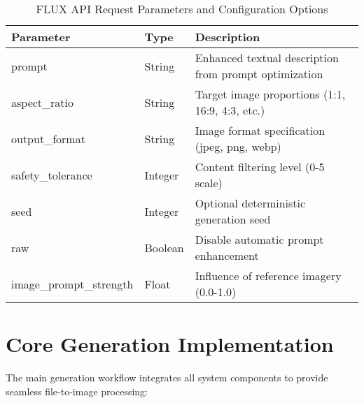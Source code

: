 \begin{table}[H]
\centering
\caption{FLUX API Request Parameters and Configuration Options}
\label{tab:flux_api_parameters}
{\begin{tabular}{lll}
\toprule
\textbf{Parameter} & \textbf{Type} & \textbf{Description} \\
\midrule
prompt & String & Enhanced textual description from prompt optimization \\
aspect\_ratio & String & Target image proportions (1:1, 16:9, 4:3, etc.) \\
output\_format & String & Image format specification (jpeg, png, webp) \\
safety\_tolerance & Integer & Content filtering level (0-5 scale) \\
seed & Integer & Optional deterministic generation seed \\
raw & Boolean & Disable automatic prompt enhancement \\
image\_prompt\_strength & Float & Influence of reference imagery (0.0-1.0) \\
\bottomrule
\end{tabular}}
\end{table}

\section{Core Generation Implementation}


The main generation workflow integrates all system components to provide seamless file-to-image processing:

